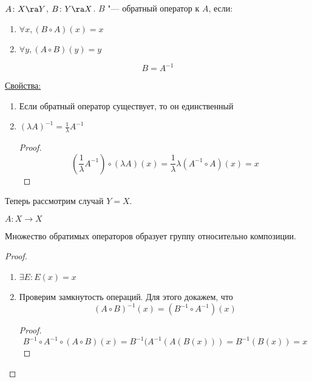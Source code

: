 \begin{Def}
	$A \colon X \ra Y$, $B \colon Y \ra X$.
	$B$ "--- обратный оператор к $A$, если:
	\begin{enumerate}
		\item $\forall x, (B \circ A)(x) = x$
		\item $\forall y, (A \circ B)(y) = y$
	\end{enumerate}
	\[ B = A^{-1} \]
\end{Def}

\underline{Свойства:}
\begin{enumerate}
	\item Если обратный оператор существует, то он единственный
	\item $(\lambda A)^{-1} = \frac{1}{\lambda}A^{-1}$
	\begin{proof}
		\[ \left(\frac{1}{\lambda}A^{-1}\right) \circ \left(\lambda A\right)(x) = \frac{1}{\lambda} \lambda\left(A^{-1} \circ A\right)(x) = x \]
	\end{proof}
\end{enumerate}

\begin{theorem}
	Теперь рассмотрим случай $Y = X$.

	$A \colon X \to X$
	 
	Множество обратимых операторов образует группу относительно композиции.
\end{theorem}
\begin{proof}
	\begin{enumerate}
	\item
		$\exists E \colon E(x) = x$
	\item
		Проверим замкнутость операций. Для этого докажем, что
		\[ (A \circ B) ^ {-1} (x) = (B^{-1} \circ A^{-1}) (x) \]
		\begin{proof}
			\[ B^{-1} \circ A^{-1} \circ (A \circ B) (x) = B^{-1}(A^{-1}(A(B(x))) = B^{-1}(B(x)) = x \]
		\end{proof}
	\end{enumerate}
\end{proof}

